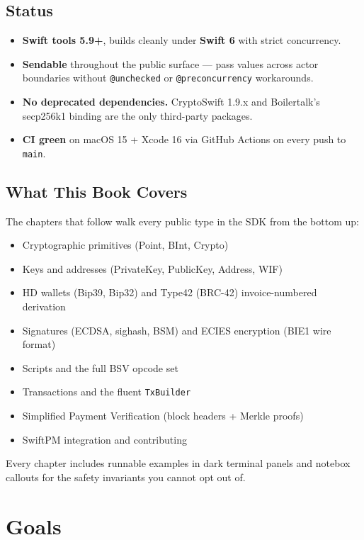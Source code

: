 \documentclass[a4paper, 11pt, openany]{book}
\begin{document}
\section{Status}

\begin{itemize}
\item \textbf{Swift tools 5.9+}, builds cleanly under \textbf{Swift 6} with strict concurrency.
\item \textbf{Sendable} throughout the public surface --- pass values across actor boundaries without \texttt{@unchecked} or \texttt{@preconcurrency} workarounds.
\item \textbf{No deprecated dependencies.} CryptoSwift 1.9.x and Boilertalk's secp256k1 binding are the only third-party packages.
\item \textbf{CI green} on macOS 15 + Xcode 16 via GitHub Actions on every push to \texttt{main}.
\end{itemize}

\section{What This Book Covers}

The chapters that follow walk every public type in the SDK from the bottom up:

\begin{itemize}
\item Cryptographic primitives (Point, BInt, Crypto)
\item Keys and addresses (PrivateKey, PublicKey, Address, WIF)
\item HD wallets (Bip39, Bip32) and Type42 (BRC-42) invoice-numbered derivation
\item Signatures (ECDSA, sighash, BSM) and ECIES encryption (BIE1 wire format)
\item Scripts and the full BSV opcode set
\item Transactions and the fluent \texttt{TxBuilder}
\item Simplified Payment Verification (block headers + Merkle proofs)
\item SwiftPM integration and contributing
\end{itemize}

Every chapter includes runnable examples in dark terminal panels and notebox callouts for the safety invariants you cannot opt out of.

\chapter{Goals}
\end{document}
